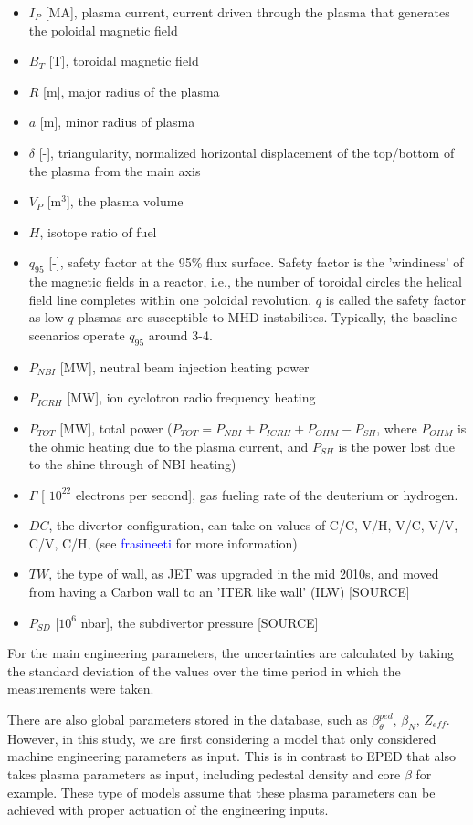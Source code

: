 \documentclass[a4paper, twoside, final, 12pt]{article}
\begin{document}
\begin{itemize}
	\item $I_P$ [MA], plasma current, current driven through the plasma that generates the poloidal magnetic field
	\item $B_T$ [T], toroidal magnetic field 
	\item $R$ [m], major radius of the plasma
	\item $a$ [m], minor radius of plasma
	\item $\delta$ [-], triangularity, normalized horizontal displacement of the top/bottom of the plasma from the main axis
	\item $V_P$ [m$^3$], the plasma volume
	\item $H$, isotope ratio of fuel
	\item $q_{95}$ [-], safety factor at the 95\% flux surface. Safety factor is the 'windiness' of the magnetic fields in a reactor, i.e., the  number of toroidal circles the helical field line completes within one poloidal revolution. $q$ is called the safety factor as low $q$ plasmas are susceptible to MHD instabilites. Typically, the baseline scenarios operate  $q_{95}$ around 3-4.
	\item $P_{NBI}$ [MW], neutral beam injection heating power
	\item $P_{ICRH}$ [MW], ion cyclotron radio frequency heating 
	\item $P_{TOT}$ [MW], total power ($P_{TOT} = P_{NBI}+ P_{ICRH} + P_{OHM} - P_{SH}$, where $P_{OHM}$ is the ohmic heating due to the plasma current, and $P_{SH}$ is the power lost due to the shine through of NBI heating)
	\item $\Gamma$ [ $10^{22}$ electrons per second], gas fueling rate of the deuterium or hydrogen.  
	\item $DC$, the divertor configuration, can take on values of C/C, V/H, V/C, V/V, C/V, C/H, (see \textcolor{blue}{frasineeti} for more information)
	\item $TW$, the type of wall, as JET was upgraded in the mid 2010s, and moved from having a Carbon wall to an 'ITER like wall' (ILW) [SOURCE]
	\item $P_{SD}$ [$10^6$ nbar], the subdivertor pressure [SOURCE]
\end{itemize}


For the main engineering parameters, the uncertainties are calculated by taking the standard deviation of the values over the time period in which the measurements were taken. 

There are also global parameters stored in the database, such as $\beta_\theta^{ped}$, $\beta_N$, $Z_{eff}$. However, in this study, we are first considering a model that only considered machine engineering parameters as input. This is in contrast to EPED that also takes plasma parameters as input, including pedestal density and core  $\beta$ for example. These type of models assume that these plasma parameters can be achieved with proper actuation of the engineering inputs. 
\end{document}
